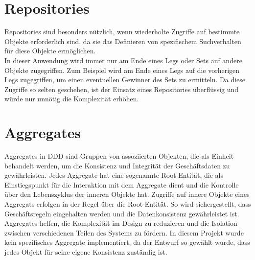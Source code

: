 \section{Repositories}
Repositories sind besonders nützlich, wenn wiederholte Zugriffe auf bestimmte Objekte erforderlich sind, da sie das Definieren von spezifischem Suchverhalten für diese Objekte ermöglichen.\\
In dieser Anwendung wird immer nur am Ende eines Legs oder Sets auf andere Objekte zugegriffen. Zum Beispiel wird am Ende eines Legs auf die vorherigen Legs zugegriffen, um einen eventuellen Gewinner des Sets zu ermitteln. Da diese Zugriffe so selten geschehen, ist der Einsatz eines Repositories überflüssig und würde nur unnötig die Komplexität erhöhen.
\section{Aggregates}

Aggregates in \acf{DDD} sind Gruppen von assoziierten Objekten, die als Einheit behandelt werden, um die Konsistenz und Integrität der Geschäftsdaten zu gewährleisten. Jedes Aggregate hat eine sogenannte Root-Entität, die als Einstiegspunkt für die Interaktion mit dem Aggregate dient und die Kontrolle über den Lebenszyklus der inneren Objekte hat. Zugriffe auf innere Objekte eines Aggregats erfolgen in der Regel über die Root-Entität. So wird sichergestellt, dass Geschäftsregeln eingehalten werden und die Datenkonsistenz gewährleistet ist. Aggregates helfen, die Komplexität im Design zu reduzieren und die Isolation zwischen verschiedenen Teilen des Systems zu fördern. In diesem Projekt wurde kein spezifisches Aggregate implementiert, da der Entwurf so gewählt wurde, dass jedes Objekt für seine eigene Konsistenz zuständig ist.